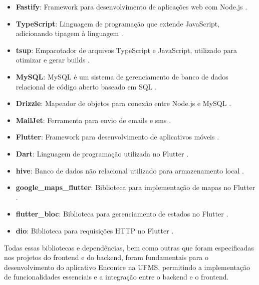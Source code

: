 \begin{itemize}
  \item \textbf{Fastify}: Framework para desenvolvimento de aplicações web com Node.js \cite{fastify}.
  \item \textbf{TypeScript}: Linguagem de programação que extende JavaScript, adicionando tipagem à linguagem \cite{typescript}.
  \item \textbf{tsup}: Empacotador de arquivos TypeScript e JavaScript, utilizado para otimizar e gerar builds \cite{tsup}.
  \item \textbf{MySQL}: MySQL é um sistema de gerenciamento de banco de dados relacional de código aberto baseado em SQL \cite{mysql}.
  \item \textbf{Drizzle}: Mapeador de objetos para conexão entre Node.js e MySQL \cite{drizzle}.
  \item \textbf{MailJet}: Ferramenta para envio de emails e sms \cite{mailjet}.
  \item \textbf{Flutter}: Framework para desenvolvimento de aplicativos móveis \cite{flutter}.
  \item \textbf{Dart}: Linguagem de programação utilizada no Flutter \cite{dart}.
  \item \textbf{hive}: Banco de dados não relacional utilizado para armazenamento local \cite{hive}.
  \item \textbf{google\_maps\_flutter}: Biblioteca para implementação de mapas no Flutter \cite{googlemapsflutter}.
  \item \textbf{flutter\_bloc}: Biblioteca para gerenciamento de estados no Flutter \cite{flutterbloc}.
  \item \textbf{dio}: Biblioteca para requisições HTTP no Flutter \cite{dio}.
\end{itemize}

Todas essas bibliotecas e dependências, bem como outras que foram especificadas nos projetos do frontend e do backend, foram fundamentais para o desenvolvimento do aplicativo Encontre na UFMS, permitindo a implementação de funcionalidades essenciais e a integração entre o backend e o frontend.